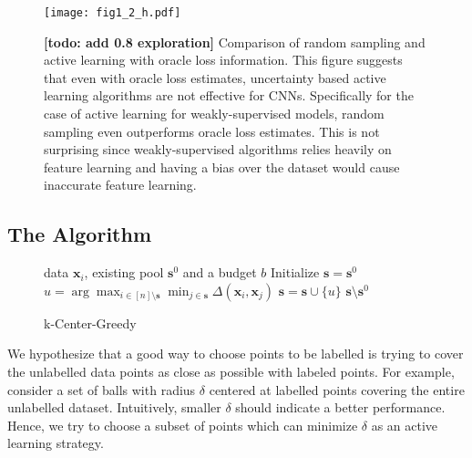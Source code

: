 \documentclass{article}
\newcommand{\todo}[1]{{\bf \color{red}[todo: #1]}}
\begin{document}
\begin{figure}[t]
\vspace{-5mm}
\texttt{[image: fig1\_2\_h.pdf]}
\vspace{-5mm}
\caption{\todo{add 0.8 exploration} Comparison of random sampling and active learning with oracle loss information. This figure suggests that even with oracle loss estimates, uncertainty based active learning algorithms are not effective for CNNs. Specifically for the case of active learning for weakly-supervised models, random sampling even outperforms oracle loss estimates. This is not surprising since weakly-supervised algorithms relies heavily on feature learning and having a bias over the dataset would cause inaccurate feature learning.}
\vspace{-5mm}
\label{fig:neg}
\end{figure}

\subsection{The Algorithm}
\label{sec:alg}
  \begin{figure}
    \begin{minipage}{0.5\textwidth}
    \vspace{-8mm}
\begin{algorithm}[H]
   \caption{k-Center-Greedy}
      \label{alg:greedy}
\begin{algorithmic}
    data $\mathbf{x}_i$, existing pool $\mathbf{s}^0$ and a budget $b$
    \STATE Initialize $\mathbf{s}=\mathbf{s}^0$
   \REPEAT
   \STATE $u=\arg\max_{i \in [n] \setminus \mathbf{s}} \min_{j \in \mathbf{s}} \Delta(\mathbf{x}_i, \mathbf{x}_j)$
   \STATE $\mathbf{s} = \mathbf{s} \cup \{u\}$
    $\mathbf{s} \setminus \mathbf{s}^0$
\end{algorithmic}
\end{algorithm}
\vspace{-8mm}
    \end{minipage}
  \end{figure}

We hypothesize that a good way to choose points to be labelled is trying to cover the unlabelled data points as close as possible with labeled points. For example, consider a set of balls with radius $\delta$ centered at labelled points covering the entire unlabelled dataset. Intuitively, smaller $\delta$ should indicate a better performance. Hence, we try to choose a subset of points which can minimize $\delta$ as an active learning strategy. 
  
\end{document}

